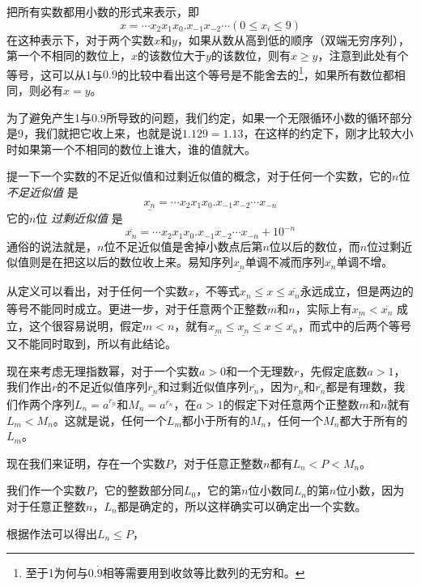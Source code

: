 把所有实数都用小数的形式来表示，即
\begin{equation}
  \label{eq:decimal-expression-of-real}
x=\cdots x_2x_1x_0.x_{-1}x_{-2}\cdots(0 \leqslant x_i \leqslant 9)
\end{equation}
在这种表示下，对于两个实数$x$和$y$，如果从数从高到低的顺序（双端无穷序列），第一个不相同的数位上，$x$的该数位大于$y$的该数位，则有$x \geqslant y$，注意到此处有个等号，这可以从1与$0.\dot{9}$的比较中看出这个等号是不能舍去的\footnote{至于1为何与$0.\dot{9}$相等需要用到收敛等比数列的无穷和。}，如果所有数位都相同，则必有$x=y$。

为了避免产生1与$0.\dot{9}$所导致的问题，我们约定，如果一个无限循环小数的循环部分是9，我们就把它收上来，也就是说$1.12\dot{9}=1.13$，在这样的约定下，刚才比较大小时如果第一个不相同的数位上谁大，谁的值就大。

提一下一个实数的不足近似值和过剩近似值的概念，对于任何一个实数，它的$n$位 \emph{不足近似值} 是
\begin{equation}
  \label{eq:lower-approximate-value-nth}
\underline{x_n}=\cdots x_2x_1x_0.x_{-1}x_{-2}\cdots x_{-n}
\end{equation}
它的$n$位 \emph{过剩近似值} 是
\begin{equation}
  \label{eq:upper-approximate-value-nth}
\overline{x_n}=\cdots x_2x_1x_0.x_{-1}x_{-2}\cdots x_{-n} + 10^{-n}
\end{equation}
通俗的说法就是，$n$位不足近似值是舍掉小数点后第$n$位以后的数位，而$n$位过剩近似值则是在把这以后的数位收上来。易知序列$\underline{x_n}$单调不减而序列$\overline{x_n}$单调不增。

从定义可以看出，对于任何一个实数$x$，不等式$\underline{x_n} \leqslant x \leqslant \overline{x_n}$永远成立，但是两边的等号不能同时成立。更进一步，对于任意两个正整数$m$和$n$，实际上有$\underline{x_m} < \overline{x_n}$ 成立，这个很容易说明，假定$m<n$，就有$\underline{x_m} \leqslant \underline{x_n} \leqslant x \leqslant \overline{x_n}$，而式中的后两个等号又不能同时取到，所以有此结论。

现在来考虑无理指数幂，对于一个实数$a>0$和一个无理数$r$，先假定底数$a>1$，我们作出$r$的不足近似值序列$\underline{r_n}$和过剩近似值序列$\overline{r_n}$，因为$\underline{r_n}$和$\overline{r_n}$都是有理数，我们作两个序列$L_n=a^{\underline{r_n}}$和$M_n=a^{\overline{r_n}}$，在$a>1$的假定下对任意两个正整数$m$和$n$就有$L_m<M_n$。这就是说，任何一个$L_m$都小于所有的$M_n$，任何一个$M_n$都大于所有的$L_m$。

现在我们来证明，存在一个实数$P$，对于任意正整数$n$都有$L_n<P<M_n$。

我们作一个实数$P$，它的整数部分同$L_0$，它的第$n$位小数同$L_n$的第$n$位小数，因为对于任意正整数$n$，$L_n$都是确定的，所以这样确实可以确定出一个实数。

根据作法可以得出$L_n \leqslant P$，




